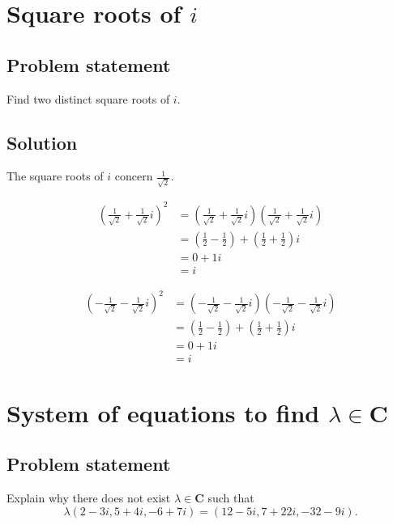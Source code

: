\documentclass{article}
\begin{document}
\clearpage

\section{Square roots of $i$}
\subsection*{Problem statement}
Find two distinct square roots of $i$.

\subsection*{Solution}
The square roots of $i$ concern $\frac{1}{\sqrt{2}}$.

\begin{align*}
    (\frac{1}{\sqrt{2}}+\frac{1}{\sqrt{2}}i)^2&=(\frac{1}{\sqrt{2}}+\frac{1}{\sqrt{2}}i)(\frac{1}{\sqrt{2}}+\frac{1}{\sqrt{2}}i)\\
    &=(\frac{1}{2}-\frac{1}{2})+(\frac{1}{2}+\frac{1}{2})i\\
    &=0+1i\\
    &=i
\end{align*}

\begin{align*}
    (-\frac{1}{\sqrt{2}}-\frac{1}{\sqrt{2}}i)^2&=(-\frac{1}{\sqrt{2}}-\frac{1}{\sqrt{2}}i)(-\frac{1}{\sqrt{2}}-\frac{1}{\sqrt{2}}i)\\
    &=(\frac{1}{2}-\frac{1}{2})+(\frac{1}{2}+\frac{1}{2})i\\
    &=0+1i\\
    &=i
\end{align*}

\clearpage

\renewcommand{\thesection}{11}
\section{System of equations to find $\lambda\in\textbf{C}$}
\subsection*{Problem statement}
Explain why there does not exist $\lambda\in\textbf{C}$ such that
\[\lambda(2-3i,5+4i,-6+7i)=(12-5i,7+22i,-32-9i).\]
\end{document}
